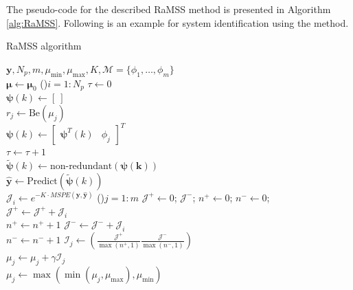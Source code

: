 The pseudo-code for the described RaMSS method is presented in Algorithm \ref{alg:RaMSS}. Following is an example for system identification using the method.

\begin{algorithm}[htpb]
  \caption{RaMSS algorithm}\label{alg:RaMSS}
  $\bm{y},N_p,m,\mu_{\min},\mu_{\max},K,\mathscr{M}=\{\phi_{1},\dots,\phi_{m}\}$ \\
   {
     $ \bm{\mu} \gets \bm{\mu}_0$
     \For(){$i=1:N_p$}
      {
         $\tau \gets 0$ \\
         $\bm{\psi}(k) \gets [\ ]$  \\
         {
           $r_j \gets \text{Be}(\mu_j)$ \\
            {
            $\bm{\psi}(k) \gets \begin{bmatrix} \bm{\psi}^T(k) & \phi_j \end{bmatrix}^T $ \\
            $\tau \gets \tau + 1$ \\
            }
         }
         {
           $\tilde{\bm{\psi}}(k) \gets \text{non-redundant}(\bm{\psi(k)})$ \\
         }
         $\hat{\bm{y}} \gets \text{Predict}(\tilde{\bm{\psi}}(k))$ \\
         $\mathcal{J}_i \gets e^{-K\cdot MSPE(\bm{y},\bm{\hat{y}})} $
      }
      \For(){$j=1:m$}
      {
         $\mathcal{J}^{+} \gets 0$; $ \mathcal{J}^{-}$; $n^{+} \gets 0$; $n^{-} \gets 0$; \\
         {
            {
               $\mathcal{J}^{+} \gets \mathcal{J}^{+} + \mathcal{J}_i$ \\
               $n^{+} \gets n^{+} + 1$
            } \Else
            {
               $\mathcal{J}^{-} \gets \mathcal{J}^{-} + \mathcal{J}_i$ \\
               $n^{-} \gets n^{-} + 1$
            }
            $\mathcal{I}_j \gets \left( \frac{\mathcal{J}^{+}}{\max(n^+,1)} \frac{\mathcal{J}^{-}}{\max(n^-,1)} \right) $ \\
         $\mu_j \gets \mu_j + \gamma \mathcal{I}_j$ \\
         $\mu_j \gets \max \left( \min(\mu_j, \mu_{\max}), \mu_{\min} \right) $ \\
         }
      }
   }
\end{algorithm}%

